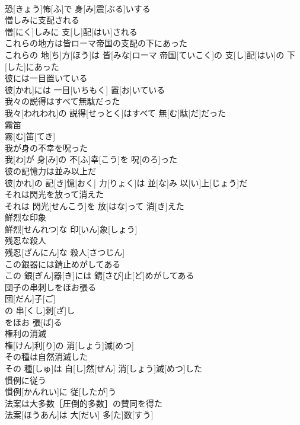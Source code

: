 \documentclass[8pt]{extreport}
\begin{document}
\begin{CJK}{UTF8}{min}
\\	恐[きょう]怖[ふ]で 身[み]震[ぶる]いする
\\	憎しみに支配される	
\\	憎[にく]しみに 支[し]配[はい]される
\\	これらの地方は皆ローマ帝国の支配の下にあった	
\\	これらの 地[ち]方[ほう]は 皆[みな]ローマ 帝国[ていこく]の 支[し]配[はい]の 下[した]にあった
\\	彼には一目置いている	
\\	彼[かれ]には 一目[いちもく] 置[お]いている
\\	我々の説得はすべて無駄だった	
\\	我々[われわれ]の 説得[せっとく]はすべて 無[む]駄[だ]だった
\\	霧笛	
\\	霧[む]笛[てき]
\\	我が身の不幸を呪った	
\\	我[わ]が 身[み]の 不[ふ]幸[こう]を 呪[のろ]った
\\	彼の記憶力は並み以上だ	
\\	彼[かれ]の 記[き]憶[おく] 力[りょく]は 並[な]み 以[い]上[じょう]だ
\\	それは閃光を放って消えた	
\\	それは 閃光[せんこう]を 放[はな]って 消[き]えた
\\	鮮烈な印象	
\\	鮮烈[せんれつ]な 印[いん]象[しょう]
\\	残忍な殺人	
\\	残忍[ざんにん]な 殺人[さつじん]
\\	この銀器には錆止めがしてある	
\\	この 銀[ぎん]器[き]には 錆[さび]止[ど]めがしてある
\\	団子の串刺しをほお張る	
\\	団[だん]子[ご]
\\	の 串[くし]刺[ざ]し 
\\	をほお 張[ば]る 
\\	権利の消滅	
\\	権[けん]利[り]の 消[しょう]滅[めつ]
\\	その種は自然消滅した	
\\	その 種[しゅ]は 自[し]然[ぜん] 消[しょう]滅[めつ]した
\\	慣例に従う	
\\	慣例[かんれい]に 従[したが]う
\\	法案は大多数［圧倒的多数］の賛同を得た	
\\	法案[ほうあん]は 大[だい] 多[た]数[すう]

\end{CJK}
\end{document}

